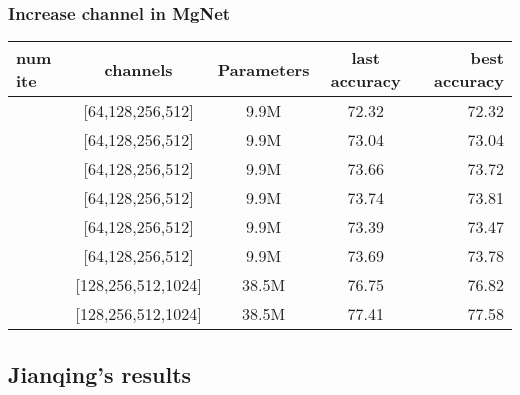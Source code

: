 \subsubsection{Increase channel in MgNet}
\begin{table}[H]
	\begin{tabular}{| l | c | c | c | r |}
		\hline
		num ite    &      channels      &    Parameters   &   last accuracy   &  best accuracy  \\
		\hline
		[2,2,2,2]   &  [64,128,256,512]  &    9.9M         &   72.32           &  72.32          \\
		\hline
		[2,2,4,2]   &  [64,128,256,512]  &    9.9M         &   73.04           &  73.04          \\
		\hline
		[2,2,8,2]   &  [64,128,256,512]  &    9.9M         &   73.66           &  73.72          \\
		\hline
		[2,2,16,2]  &  [64,128,256,512]  &    9.9M         &   73.74           &  73.81          \\
		\hline
		\hline
		[3,3,5,2]   &  [64,128,256,512]  &    9.9M         &   73.39           &  73.47          \\
		\hline
		[3,4,6,3]   &  [64,128,256,512]  &    9.9M         &   73.69           &  73.78          \\
		\hline
		\hline
		[2,2,2,2]   & [128,256,512,1024] &   38.5M         &   76.75           &  76.82          \\
		\hline
		[2,2,4,2]   & [128,256,512,1024] &   38.5M         &   77.41           &  77.58           \\
		\hline
	\end{tabular}
\end{table}

\subsection{Jianqing's results}
